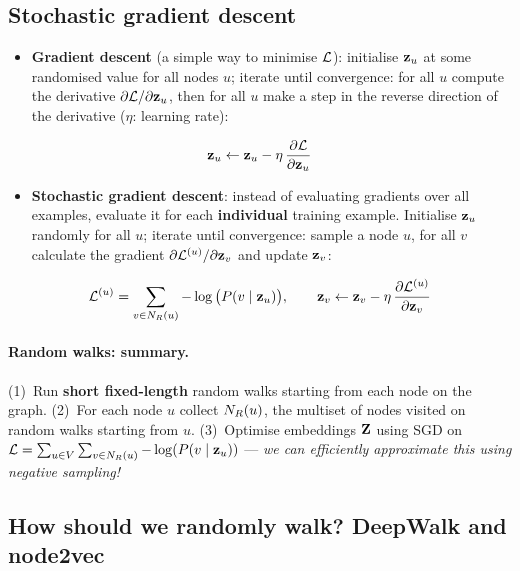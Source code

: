 \subsection{Stochastic gradient descent}\label{sec:lec02-sgd}

\begin{itemize}
  \item \textbf{Gradient descent} (a simple way to minimise $\mathcal{L}$): initialise
    $\mathbf{z}_u$ at some randomised value for all nodes $u$; iterate until
    convergence: for all $u$ compute the derivative $\partial\mathcal{L}/\partial\mathbf{z}_u$,
    then for all $u$ make a step in the reverse direction of the derivative
    ($\eta$: learning rate):
\end{itemize}
\begin{equation}\label{eq:lec02-gd}
  \mathbf{z}_u\leftarrow\mathbf{z}_u-\eta\,\frac{\partial\mathcal{L}}{\partial\mathbf{z}_u}
\end{equation}
\begin{itemize}
  \item \textbf{Stochastic gradient descent}: instead of evaluating gradients
    over all examples, evaluate it for each \textbf{individual} training example.
    Initialise $\mathbf{z}_u$ randomly for all $u$; iterate until convergence: sample a
    node $u$, for all $v$ calculate the gradient $\partial\mathcal{L}^{(u)}/\partial\mathbf{z}_v$
    and update $\mathbf{z}_v$:
\end{itemize}
\begin{equation}\label{eq:lec02-sgd}
  \mathcal{L}^{(u)}=\sum_{v\in N_R(u)}-\log\big(P(v\mid\mathbf{z}_u)\big),
  \qquad
  \mathbf{z}_v\leftarrow\mathbf{z}_v-\eta\,\frac{\partial\mathcal{L}^{(u)}}{\partial\mathbf{z}_v}
\end{equation}
\paragraph{Random walks: summary.}
(1)~Run \textbf{short fixed-length} random walks starting from each node on the
graph. (2)~For each node $u$ collect $N_R(u)$, the multiset of nodes visited on
random walks starting from $u$. (3)~Optimise embeddings $\mathbf{Z}$ using SGD on
$\mathcal{L}=\sum_{u\in V}\sum_{v\in N_R(u)}-\log(P(v\mid\mathbf{z}_u))$ ---
\emph{we can efficiently approximate this using negative sampling!}

\subsection{How should we randomly walk? DeepWalk and node2vec}\label{sec:lec02-node2vec}

